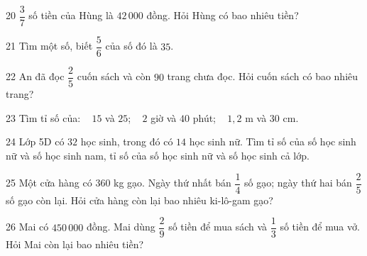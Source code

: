 \gap
\begin{probbox}{20}{\relax}
$\dfrac37$ số tiền của Hùng là $42\,000$ đồng. Hỏi Hùng có bao nhiêu tiền?
\end{probbox}
\gap
\begin{probbox}{21}{\relax}
Tìm một số, biết $\dfrac56$ của số đó là $35$.
\end{probbox}
\gap
\begin{probbox}{22}{\relax}
An đã đọc $\dfrac25$ cuốn sách và còn $90$ trang chưa đọc. Hỏi cuốn sách có bao nhiêu trang?
\end{probbox}
\gap
\begin{probbox}{23}{\relax}
Tìm tỉ số của: \  $15$ và $25$; \  $2$ giờ và $40$ phút; \  $1{,}2$ m và $30$ cm.
\end{probbox}
\gap
\begin{probbox}{24}{\relax}
Lớp 5D có $32$ học sinh, trong đó có $14$ học sinh nữ. Tìm tỉ số của số học sinh nữ và số học sinh nam, tỉ số của số học sinh nữ và số học sinh cả lớp.
\end{probbox}
\gap
\begin{probbox}{25}{\relax}
Một cửa hàng có $360$ kg gạo. Ngày thứ nhất bán $\dfrac14$ số gạo; ngày thứ hai bán $\dfrac25$ số gạo còn lại. Hỏi cửa hàng còn lại bao nhiêu ki-lô-gam gạo?
\end{probbox}
\gap
\begin{probbox}{26}{\relax}
Mai có $450\,000$ đồng. Mai dùng $\dfrac29$ số tiền để mua sách và $\dfrac13$ số tiền để mua vở. Hỏi Mai còn lại bao nhiêu tiền?
\end{probbox}
